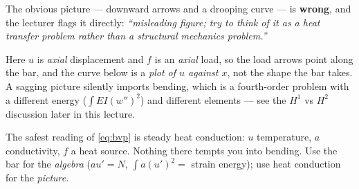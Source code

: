 \begin{center}
\end{center}

\begin{pitfall}
The obvious picture --- downward arrows and a drooping curve --- is
\textbf{wrong}, and the lecturer flags it directly: \emph{``misleading figure;
try to think of it as a heat transfer problem rather than a structural
mechanics problem.''}

Here $u$ is \emph{axial} displacement and $f$ is an \emph{axial} load, so the
load arrows point along the bar, and the curve below is a \emph{plot of $u$
against $x$}, not the shape the bar takes. A sagging picture silently imports
bending, which is a fourth-order problem with a different energy
($\int EI(w'')^{2}$) and different elements --- see the $H^{1}$ vs $H^{2}$
discussion later in this lecture.

The safest reading of \eqref{eq:bvp} is steady heat conduction: $u$
temperature, $a$ conductivity, $f$ a heat source. Nothing there tempts you into
bending. Use the bar for the \emph{algebra} ($au'=N$, $\int a(u')^{2}=$ strain
energy); use heat conduction for the \emph{picture}.
\end{pitfall}


